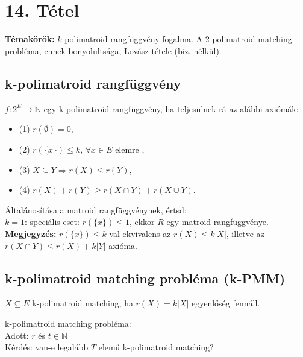 
\setcounter{chapter}{14}
\chapter*{14. Tétel}

\textbf{Témakörök:} $k$-polimatroid rangfüggvény fogalma. A 2-polimatroid-matching probléma, ennek bonyolultsága, Lovász tétele (biz. nélkül).

\noindent\hrulefill

\section*{k-polimatroid rangfüggvény}
$f:2^{E}\rightarrow \mathbb{N}$ egy k-polimatroid rangfüggvény, ha teljesülnek rá az alábbi axiómák:
\begin{itemize}
\item (1) $r(\emptyset )=0$,
\item (2) $r(\lbrace x\rbrace)\leq k$, $\forall x\in E$ elemre ,
\item (3) $X\subseteq Y \Rightarrow r(X)\leq r(Y)$,
\item (4) $r(X)+r(Y)\geq r(X\cap Y)+r(X\cup Y)$.
\end{itemize}
Általánosítása a matroid rangfüggvénynek, értsd:\\
$k=1$: speciális eset: $r(\lbrace x\rbrace )\leq 1$, ekkor $R$ egy matroid rangfüggvénye.\\
\textbf{Megjegyzés:} $r(\lbrace x\rbrace )\leq k$-val ekvivalens az $r(X)\leq k|X|$, illetve az $r(X\cap Y)\leq r(X)+k|Y|$ axióma.

\section*{k-polimatroid matching probléma (k-PMM)}
\begin{defn} $X\subseteq E$ k-polimatroid matching, ha $r(X)=k|X|$ egyenlőség fennáll.\end{defn}
\begin{defn} k-polimatroid matching probléma:\\
Adott: $r$ és $t\in \mathbb{N}$\\
Kérdés: van-e legalább $T$ elemű k-polimatroid matching?
\end{defn}

